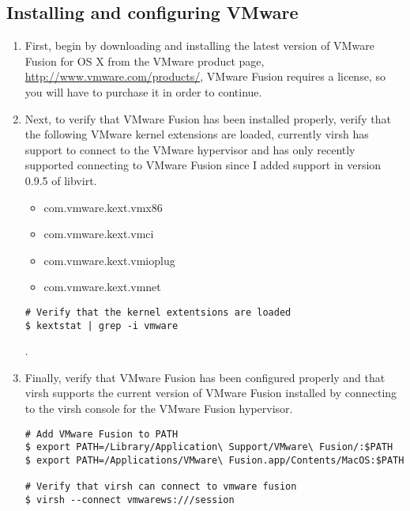 \subsection{Installing and configuring VMware}
\label{sec:osxvmware}
\begin{enumerate}
\item	First, begin by downloading and installing the latest version of VMware Fusion for OS X from the VMware product 
		page, \url{http://www.vmware.com/products/}, VMware Fusion requires a license, so you will have to purchase it
		in order to continue.
		
\item	Next, to verify that VMware Fusion has been installed properly, verify that the following VMware kernel extensions 
		are loaded, currently virsh has support to connect to the VMware hypervisor and has only recently supported connecting
		to VMware Fusion since I added support in version 0.9.5 of libvirt.
		
\begin{itemize}
\item	com.vmware.kext.vmx86
\item	com.vmware.kext.vmci
\item	com.vmware.kext.vmioplug
\item	com.vmware.kext.vmnet
\end{itemize}

\lstset{language=bash,caption=Verify VMware Kernel Extensions Loaded}
\begin{lstlisting}
# Verify that the kernel extentsions are loaded
$ kextstat | grep -i vmware
\end{lstlisting}

.\item      Finally, verify that VMware Fusion has been configured properly and that virsh supports the current version of VMware Fusion
                installed by connecting to the virsh console for the VMware Fusion hypervisor.

\lstset{language=bash,caption=Verify VMware Fusion Works with Virsh}
\begin{lstlisting}
# Add VMware Fusion to PATH
$ export PATH=/Library/Application\ Support/VMware\ Fusion/:$PATH
$ export PATH=/Applications/VMware\ Fusion.app/Contents/MacOS:$PATH

# Verify that virsh can connect to vmware fusion
$ virsh --connect vmwarews:///session
\end{lstlisting}
\end{enumerate}




